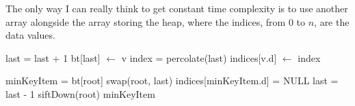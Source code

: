 \documentclass[12pt,letterpaper]{hmcpset}
\begin{document}
\begin{solution}
The only way I can really think to get constant time complexity is to use another array alongside the array storing the heap, where the indices, from 0 to $n$, are the data values.
\begin{algorithmic}
\State last = last + 1
\State bt[last] $\leftarrow$ v
\State index = percolate(last)
\State indices[v.d] $\leftarrow$ index
\EndFunction
\end{algorithmic}

\begin{algorithmic}
\State minKeyItem = bt[root]
\State swap(root, last)
\State indices[minKeyItem.d] = NULL
\State last = last - 1
\State siftDown(root)
\EndIf
\State \Return minKeyItem
\EndFunction
\end{algorithmic}
\end{solution}
\end{document}
